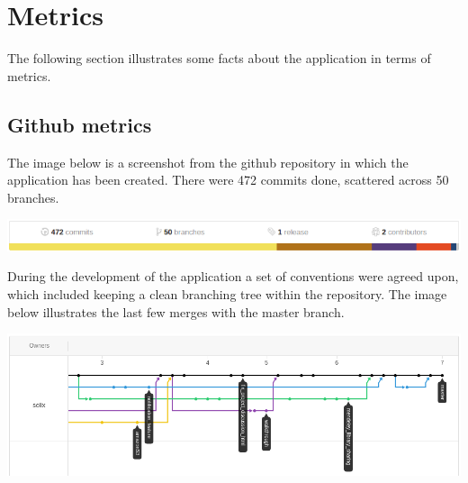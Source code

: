 \section{Metrics}

The following section illustrates some facts about the application in terms of metrics. 

\subsection{Github metrics}

The image below is a screenshot from the github repository in which the application has been created.
There were 472 commits done, scattered across 50 branches.

\begin{center}
\includegraphics[scale=0.5]{./img/github_stats.png}
\end{center}

During the development of the application a set of conventions were agreed upon, which included keeping a clean
branching tree within the repository. The image below illustrates the last few merges with the master branch.

\begin{center}
\includegraphics[scale=0.5]{./img/github_tree.png}
\end{center}



